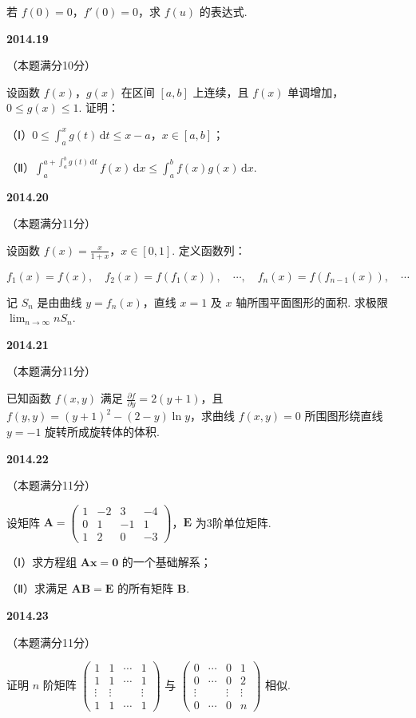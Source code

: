 \documentclass[UTF8,12pt,fontset=windows]{ctexart}
\begin{document}
若 $f(0) = 0$，$f'(0) = 0$，求 $f(u)$ 的表达式.

\vfill
\newpage
{\large\bfseries 2014.19}

（本题满分10分）

设函数 $f(x)$，$g(x)$ 在区间 $[a, b]$ 上连续，且 $f(x)$ 单调增加，$0 \leqslant g(x) \leqslant 1$. 证明：

（Ⅰ）$0 \leqslant \int_a^x g(t)\,\mathrm{d}t \leqslant x - a$，$x \in [a, b]$；

（Ⅱ）$\int_a^{a + \int_a^b g(t)\,\mathrm{d}t} f(x)\,\mathrm{d}x \leqslant \int_a^b f(x)g(x)\,\mathrm{d}x$.

\vfill
\newpage
{\large\bfseries 2014.20}

（本题满分11分）

设函数 $f(x) = \frac{x}{1 + x}$，$x \in [0, 1]$. 定义函数列：

$$f_1(x) = f(x), \quad f_2(x) = f(f_1(x)), \quad \cdots, \quad f_n(x) = f(f_{n-1}(x)), \quad \cdots$$

记 $S_n$ 是由曲线 $y = f_n(x)$，直线 $x = 1$ 及 $x$ 轴所围平面图形的面积. 求极限 $\lim_{n \to \infty} nS_n$.

\vfill
\newpage
{\large\bfseries 2014.21}

（本题满分11分）

已知函数 $f(x, y)$ 满足 $\frac{\partial f}{\partial y} = 2(y + 1)$，且 $f(y, y) = (y + 1)^2 - (2 - y)\ln y$，求曲线 $f(x, y) = 0$ 所围图形绕直线 $y = -1$ 旋转所成旋转体的体积.

\vfill
\newpage
{\large\bfseries 2014.22}

（本题满分11分）

设矩阵 $\boldsymbol{A} = \begin{pmatrix} 1 & -2 & 3 & -4 \\ 0 & 1 & -1 & 1 \\ 1 & 2 & 0 & -3 \end{pmatrix}$，$\boldsymbol{E}$ 为3阶单位矩阵.

（Ⅰ）求方程组 $\boldsymbol{Ax} = \boldsymbol{0}$ 的一个基础解系；

（Ⅱ）求满足 $\boldsymbol{AB} = \boldsymbol{E}$ 的所有矩阵 $\boldsymbol{B}$.

\vfill
\newpage
{\large\bfseries 2014.23}

（本题满分11分）

证明 $n$ 阶矩阵 $\begin{pmatrix} 1 & 1 & \cdots & 1 \\ 1 & 1 & \cdots & 1 \\ \vdots & \vdots & & \vdots \\ 1 & 1 & \cdots & 1 \end{pmatrix}$ 与 $\begin{pmatrix} 0 & \cdots & 0 & 1 \\ 0 & \cdots & 0 & 2 \\ \vdots & & \vdots & \vdots \\ 0 & \cdots & 0 & n \end{pmatrix}$ 相似.

\vfill
\end{document}
